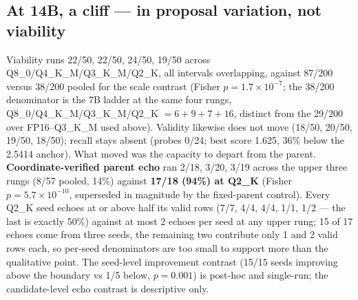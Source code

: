 \subsection{At 14B, a cliff --- in proposal variation, not viability}

Viability runs 22/50, 22/50, 24/50, 19/50 across Q8\_0/Q4\_K\_M/Q3\_K\_M/Q2\_K, all intervals overlapping, against 87/200 versus 38/200 pooled for the scale contrast (Fisher $p = 1.7\times10^{-7}$; the 38/200 denominator is the 7B ladder at the same four rungs, Q8\_0/Q4\_K\_M/Q3\_K\_M/Q2\_K $= 6+9+7+16$, distinct from the 29/200 over FP16--Q3\_K\_M used above). Validity likewise does not move (18/50, 20/50, 19/50, 18/50); recall stays absent (probes 0/24; best score 1.625, 36\% below the 2.5414 anchor). What moved was the capacity to depart from the parent. \textbf{Coordinate-verified parent echo} ran 2/18, 3/20, 3/19 across the upper three rungs (8/57 pooled, 14\%) against \textbf{17/18 (94\%) at Q2\_K} (Fisher $p = 5.7\times10^{-10}$, superseded in magnitude by the fixed-parent control). Every Q2\_K seed echoes at or above half its valid rows (7/7, 4/4, 4/4, 1/1, 1/2 --- the last is exactly 50\%) against at most 2 echoes per seed at any upper rung; 15 of 17 echoes come from three seeds, the remaining two contribute only 1 and 2 valid rows each, so per-seed denominators are too small to support more than the qualitative point. The seed-level improvement contrast (15/15 seeds improving above the boundary vs 1/5 below, $p = 0.001$) is post-hoc and single-run; the candidate-level echo contrast is descriptive only.

